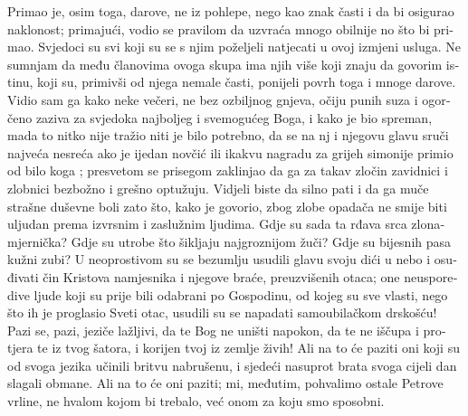 \documentclass[a5paper,twoside]{article}
\begin{document}
\begin{pages}
\begin{Rightside}
\begin{croatian}
\pend
\pstart
Primao je, osim toga, darove, ne iz pohlepe, nego kao znak časti i da bi osigurao naklonost; primajući, vodio se pravilom da uzvraća mnogo obilnije no što bi primao.  Svjedoci su svi koji su se s njim poželjeli natjecati u ovoj izmjeni usluga.  Ne sumnjam da među članovima ovoga skupa ima njih više koji znaju da govorim istinu, koji su, primivši od njega nemale časti, ponijeli povrh toga i mnoge darove.
\pend
\pstart
Vidio sam ga kako neke večeri, ne bez ozbiljnog gnjeva, očiju punih suza i ogorčeno zaziva za svjedoka najboljeg i svemogućeg Boga, i kako je bio spreman, mada to nitko nije tražio niti je bilo potrebno, da se na nj i njegovu glavu sruči najveća nesreća ako je ijedan novčić ili ikakvu nagradu za grijeh simonije primio od bilo koga ; presvetom se prisegom zaklinjao da ga za takav zločin zavidnici i zlobnici bezbožno i grešno optužuju.  Vidjeli biste da silno pati i da ga muče strašne duševne boli zato što, kako je govorio, zbog zlobe opadača ne smije biti uljudan prema izvrsnim i zaslužnim ljudima.
\pend
\pstart
Gdje su sada ta rđava srca zlonamjernička?  Gdje su utrobe što šikljaju najgroznijom žuči?  Gdje su bijesnih pasa kužni zubi?  U neoprostivom su se bezumlju usudili glavu svoju dići u nebo i osuđivati čin Kristova namjesnika i njegove braće, preuzvišenih otaca; one neusporedive ljude koji su prije bili odabrani po Gospodinu, od kojeg su sve vlasti, nego što ih je proglasio Sveti otac, usudili su se napadati samoubilačkom drskošću!  Pazi se, pazi, jeziče lažljivi, da te Bog ne uništi napokon, da te ne iščupa i protjera te iz tvog šatora, i korijen tvoj iz zemlje živih! Ali na to će paziti oni koji su od svoga jezika učinili britvu nabrušenu, i sjedeći nasuprot brata svoga cijeli dan slagali obmane. Ali na to će oni paziti; mi, međutim, pohvalimo ostale Petrove vrline, ne hvalom kojom bi trebalo, već onom za koju smo sposobni.  
\pend
\pstart

\end{croatian}
\end{Rightside}
\end{pages}
\end{document}

